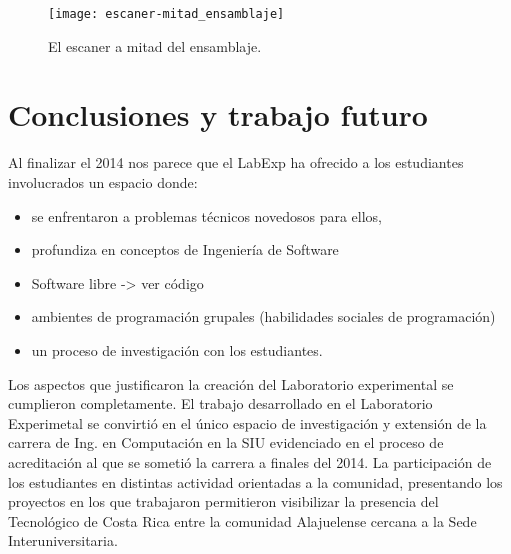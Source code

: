 \documentclass[conference]{IEEEtran}
\begin{document}
\begin{figure}[!t]
\centering
\texttt{[image: escaner-mitad\_ensamblaje]}
\caption{El escaner a mitad del ensamblaje.}
\label{escaner}
\end{figure}





\section{Conclusiones y trabajo futuro}

Al finalizar el 2014 nos parece que el LabExp ha ofrecido a los estudiantes involucrados un espacio donde:

\begin{itemize}
    \item se enfrentaron a problemas técnicos novedosos para ellos, 
    \item profundiza en conceptos de Ingeniería de Software
    \item Software libre -> ver código
    \item ambientes de programación grupales (habilidades sociales de programación)
    \item un proceso de investigación con los estudiantes.
\end{itemize}

Los aspectos que justificaron la creación del Laboratorio experimental se
cumplieron completamente. El trabajo desarrollado en el Laboratorio Experimetal
se convirtió en el único espacio de investigación y extensión de la carrera de
Ing. en Computación en la SIU evidenciado en el proceso de acreditación al que
se sometió la carrera a finales del 2014. La participación de los estudiantes en
distintas actividad orientadas a la comunidad, presentando los proyectos en los
que trabajaron permitieron visibilizar la presencia del Tecnológico de Costa
Rica entre la comunidad Alajuelense cercana a la Sede Interuniversitaria. 
\end{document}
